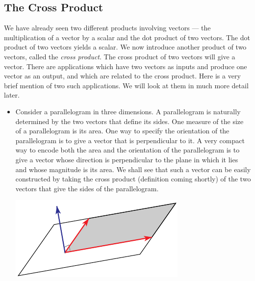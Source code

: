 \subsection{The Cross Product}
We have already seen two different products involving vectors ---
the multiplication of a vector by a scalar 
and the dot product of two vectors. The dot product of two vectors
yields a scalar. We now introduce another product 
of two vectors, called the \emph{cross product}. The cross product of
two vectors will give a vector. There are applications which have two 
vectors as inputs and produce one vector as an output, and which are related
to the cross product. Here is a very brief mention of two such applications. 
We will look at them in much more detail later. 
\begin{itemize}
\item 
Consider a parallelogram in three dimensions.
A parallelogram is naturally determined by the two vectors that define 
its sides.
One measure of the size of a parallelogram is its area. 
One way to specify the orientation of the parallelogram is to give a vector
that is perpendicular to it. 
A very compact way to encode both the area and the orientation of
the parallelogram is to give a vector whose direction is perpendicular 
to the plane in which it lies and whose magnitude is its area.
We shall see that such a vector can be easily constructed by taking the cross product (definition coming shortly) of the two vectors that give
the sides of the parallelogram.

      \begin{nfig} 
      \begin{center}
      \includegraphics{pgramCross.pdf}
      \end{center}
      \end{nfig}


\end{itemize}
